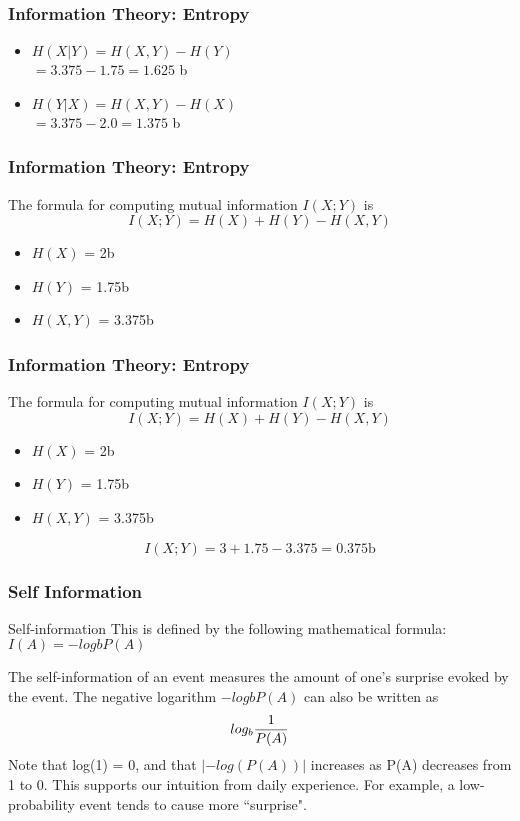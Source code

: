 ﻿\documentclass[a4]{beamer}
\begin{document}
\begin{frame}
\frametitle{Information Theory: Entropy}
\Large
\vspace{-1.2cm}
\begin{itemize}
\item $H(X|Y) = H(X,Y)-H(Y)$ \\ \bigskip $= 3.375 - 1.75 = 1.625$ b
\bigskip\vspace{0.8cm}
\item $H(Y|X) = H(X,Y)-H(X)$ \\ \bigskip $= 3.375 - 2.0 = 1.375$ b
\end{itemize}
\bigskip


\end{frame}
\begin{frame}
\frametitle{Information Theory: Entropy}
\Large
\vspace{-1.5cm}
The formula for computing mutual information $I(X;Y)$ is 
\[I(X; Y ) = H(X) + H(Y ) - H(X,Y )\]

\begin{itemize}
\item $H(X)$ = 2b
\item $H(Y)$ = 1.75b
\item $H(X,Y) $ = 3.375b
\end{itemize}

\end{frame}

\begin{frame}
\frametitle{Information Theory: Entropy}
\Large
\vspace{-1.5cm}
The formula for computing mutual information $I(X;Y)$ is 
\[I(X; Y ) = H(X) + H(Y ) - H(X,Y )\]

\begin{itemize}
\item $H(X)$ = 2b
\item $H(Y)$ = 1.75b
\item $H(X,Y) $ = 3.375b
\end{itemize}
\LARGE
\[I(X; Y ) = 3 + 1.75 - 3.375 = 0.375\mbox{b}\]
\end{frame}










\begin{frame} %
\frametitle{Self Information}Self-information
This is defined by the following mathematical formula:$I(A) = −logb P(A)$

The self-information of an event measures the amount of one's surprise
evoked by the event. The negative logarithm $−logb P(A)$ can also be written as \[
log_b  {1 \over P(A)} \]
Note that log(1) = 0, and that $| − log(P(A))|$ increases as P(A) decreases
from 1 to 0. This supports our intuition from daily experience. For example,
a low-probability event tends to cause more ``surprise".
\end{frame}
\end{document}

